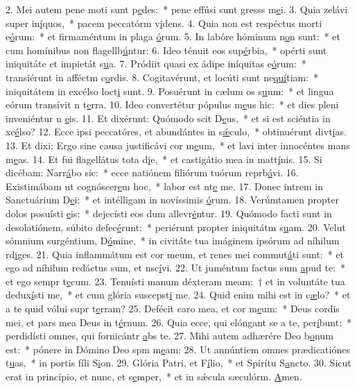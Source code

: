 2. Mei autem pene moti sunt p\uline{e}des:~* pene effúsi sunt gresss m\uline{e}i.
3. Quia zelávi super in\uline{í}quos,~* pacem peccatórm v\uline{i}dens.
4. Quia non est respéctus morti e\uline{ó}rum:~* et firmaméntum in plaga \uline{ó}rum.
5. In labóre hóminum n\uline{o}n sunt:~* et cum homínibus non flagellb\uline{ú}ntur:
6. Ideo ténuit eos sup\uline{é}rbia,~* opérti sunt iniquitáte et impietát s\uline{u}a.
7. Pródiit quasi ex ádipe iníquitas e\uline{ó}rum:~* transiérunt in afféctm c\uline{o}rdis.
8. Cogitavérunt, et locúti sunt ne\uline{quí}tiam:~* iniquitátem in excélso loct\uline{i} sunt.
9. Posuérunt in cælum os s\uline{u}um:~* et lingua eórum transívit n t\uline{e}rra.
10. Ideo convertétur pópulus m\uline{e}us hic:~* et dies pleni inveniéntur n \uline{e}is.
11. Et dixérunt: Quómodo scit D\uline{e}us,~* et si est sciéntia in xc\uline{é}lso?
12. Ecce ipsi peccatóres, et abundántes in s\uline{ǽ}culo,~* obtinuérunt divt\uline{i}as.
13. Et dixi: Ergo sine causa justificávi cor m\uline{e}um,~* et lavi inter innocéntes mans m\uline{e}as.
14. Et fui flagellátus tota d\uline{i}e,~* et castigátio mea in matt\uline{í}nis.
15. Si dicébam: Narr\uline{á}bo sic:~* ecce natiónem filiórum tuórum reprb\uline{á}vi.
16. Existimábam ut cognóscer\uline{e}m hoc,~* labor est nt\uline{e} me.
17. Donec intrem in Sanctuárium D\uline{e}i:~* et intélligam in novíssimis \uline{ó}rum.
18. Verúmtamen propter dolos posuísti \uline{e}is:~* dejecísti eos dum allevr\uline{é}ntur.
19. Quómodo facti sunt in desolatiónem, súbito defec\uline{é}runt:~* periérunt propter iniquitátm s\uline{u}am.
20. Velut sómnium surgéntium, D\uline{ó}mine,~* in civitáte tua imáginem ipsórum ad níhilum rd\uline{i}ges.
21. Quia inflammátum est cor meum, et renes mei commut\uline{á}ti sunt:~* et ego ad níhilum redáctus sum, et nsc\uline{í}vi.
22. Ut juméntum factus sum \uline{a}pud te:~* et ego sempr t\uline{e}cum.
23. Tenuísti manum déxteram meam:~† et in voluntáte tua dedux\uline{í}sti me,~* et cum glória suscepst\uline{i} me.
24. Quid enim mihi est in c\uline{æ}lo?~* et a te quid vólui supr t\uline{e}rram?
25. Defécit caro mea, et cor m\uline{e}um:~* Deus cordis mei, et pars mea Deus in t\uline{é}rnum.
26. Quia ecce, qui elóngant se a te, per\uline{í}bunt:~* perdidísti omnes, qui fornicántr \uline{a}bs te.
27. Mihi autem adhærére Deo b\uline{o}num est:~* pónere in Dómino Deo spm m\uline{e}am:
28. Ut annúntiem omnes prædicatiónes t\uline{u}as,~* in portis fíli S\uline{i}on.
29. Glória Patri, et F\uline{í}lio,~* et Spirítu S\uline{a}ncto.
30. Sicut erat in princípio, et nunc, et s\uline{e}mper,~* et in sǽcula sæculórm. \uline{A}men.
